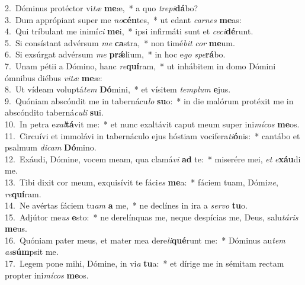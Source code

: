 {2.~}Dóminus protéctor vi\textit{tæ} \textbf{me}æ,~* a quo \textit{tre}\textit{pi}\textbf{dá}bo?\\
{3.~}Dum apprópiant super me \textit{no}\textbf{cén}tes,~* ut edant \textit{car}\textit{nes} \textbf{me}as:\\
{4.~}Qui tríbulant me inimí\textit{ci} \textbf{me}i,~* ipsi infirmáti sunt et \textit{ce}\textit{ci}\textbf{dé}runt.\\
{5.~}Si consístant advérsum \textit{me} \textbf{ca}stra,~* non timé\textit{bit} \textit{cor} \textbf{me}um.\\
{6.~}Si exsúrgat advérsum \textit{me} \textbf{prǽ}lium,~* in hoc e\textit{go} \textit{spe}\textbf{rá}bo.\\
{7.~}Unam pétii a Dómino, hanc \textit{re}\textbf{quí}ram,~* ut inhábitem in domo Dómini ómnibus diébus \textit{vi}\textit{tæ} \textbf{me}æ:\\
{8.~}Ut vídeam voluptá\textit{tem} \textbf{Dó}mini,~* et vísitem \textit{tem}\textit{plum} \textbf{e}jus.\\
{9.~}Quóniam abscóndit me in tabernácu\textit{lo} \textbf{su}o:~* in die malórum protéxit me in abscóndito taberná\textit{cu}\textit{li} \textbf{su}i.\\
{10.~}In petra e\textit{xal}\textbf{tá}vit me:~* et nunc exaltávit caput meum super ini\textit{mí}\textit{cos} \textbf{me}os.\\
{11.~}Circuívi et immolávi in tabernáculo ejus hóstiam vocifera\textit{ti}\textbf{ó}nis:~* cantábo et psalmum \textit{di}\textit{cam} \textbf{Dó}mino.\\
{12.~}Exáudi, Dómine, vocem meam, qua clamá\textit{vi} \textbf{ad} te:~* miserére mei, \textit{et} \textit{e}\textbf{xáu}di me.\\
{13.~}Tibi dixit cor meum, exquisívit te fáci\textit{es} \textbf{me}a:~* fáciem tuam, Dómi\textit{ne}, \textit{re}\textbf{quí}ram.\\
{14.~}Ne avértas fáciem tu\textit{am} \textbf{a} me,~* ne declínes in ira a \textit{ser}\textit{vo} \textbf{tu}o.\\
{15.~}Adjútor me\textit{us} \textbf{e}sto:~* ne derelínquas me, neque despícias me, Deus, salu\textit{tá}\textit{ris} \textbf{me}us.\\
{16.~}Quóniam pater meus, et mater mea dere\textit{li}\textbf{qué}runt me:~* Dóminus au\textit{tem} \textit{as}\textbf{súm}psit me.\\
{17.~}Legem pone mihi, Dómine, in vi\textit{a} \textbf{tu}a:~* et dírige me in sémitam rectam propter ini\textit{mí}\textit{cos} \textbf{me}os.\\
